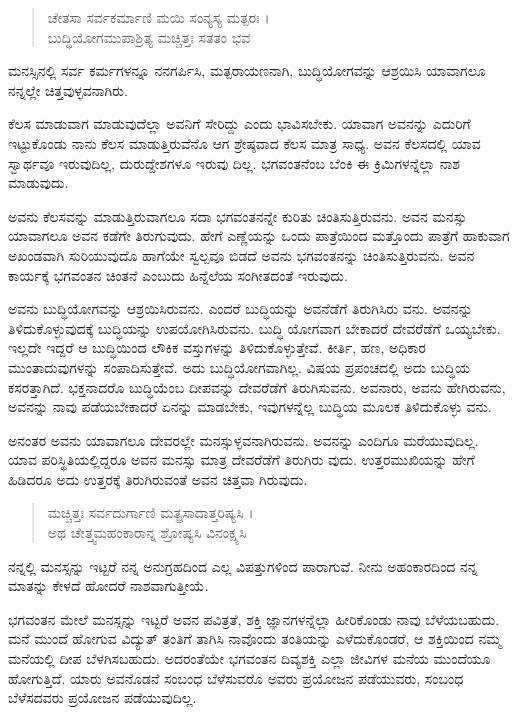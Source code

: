 \begin{verse}
ಚೇತಸಾ ಸರ್ವಕರ್ಮಾಣಿ ಮಯಿ ಸಂನ್ಯಸ್ಯ ಮತ್ಪರಃ ।\\ಬುದ್ಧಿಯೋಗಮುಪಾಶ್ರಿತ್ಯ ಮಚ್ಚಿತ್ತಃ ಸತತಂ ಭವ 
\end{verse}

{\small ಮನಸ್ಸಿನಲ್ಲಿ ಸರ್ವ ಕರ್ಮಗಳನ್ನೂ ನನಗರ್ಪಿಸಿ, ಮತ್ಪರಾಯಣನಾಗಿ, ಬುದ್ಧಿಯೋಗವನ್ನು ಆಶ್ರಯಿಸಿ ಯಾವಾಗಲೂ ನನ್ನಲ್ಲೇ ಚಿತ್ತವುಳ್ಳವನಾಗಿರು.}

ಕೆಲಸ ಮಾಡುವಾಗ ಮಾಡುವುದೆಲ್ಲಾ ಅವನಿಗೆ ಸೇರಿದ್ದು ಎಂದು ಭಾವಿಸಬೇಕು. ಯಾವಾಗ ಅವನನ್ನು ಎದುರಿಗೆ ಇಟ್ಟುಕೊಂಡು ನಾನು ಕೆಲಸ ಮಾಡುತ್ತಿರುವೆನೊ ಆಗ ಶ್ರೇಷ್ಠವಾದ ಕೆಲಸ ಮಾತ್ರ ಸಾಧ್ಯ. ಅವನ ಕೆಲಸದಲ್ಲಿ ಯಾವ ಸ್ವಾರ್ಥವೂ ಇರುವುದಿಲ್ಲ, ದುರುದ್ದೇಶಗಳೂ ಇರುವು ದಿಲ್ಲ. ಭಗವಂತನೆಂಬ ಬೆಂಕಿ ಈ ಕ್ರಿಮಿಗಳನ್ನೆಲ್ಲಾ ನಾಶ ಮಾಡುವುದು.

ಅವನು ಕೆಲಸವನ್ನು ಮಾಡುತ್ತಿರುವಾಗಲೂ ಸದಾ ಭಗವಂತನನ್ನೇ ಕುರಿತು ಚಿಂತಿಸುತ್ತಿರುವನು. ಅವನ ಮನಸ್ಸು ಯಾವಾಗಲೂ ಅವನ ಕಡೆಗೇ ತಿರುಗುವುದು. ಹೇಗೆ ಎಣ್ಣೆಯನ್ನು ಒಂದು ಪಾತ್ರೆಯಿಂದ ಮತ್ತೊಂದು ಪಾತ್ರೆಗೆ ಹಾಕುವಾಗ ಅಖಂಡವಾಗಿ ಸುರಿಯುವುದೊ ಹಾಗೆಯೇ ಸ್ವಲ್ಪವೂ ಬಿಡದೆ ಅವನು ಭಗವಂತನನ್ನು ಚಿಂತಿಸುತ್ತಿರುವನು. ಅವನ ಕಾರ್ಯಕ್ಕೆ ಭಗವಂತನ ಚಿಂತನೆ ಎಂಬುದು ಹಿನ್ನೆಲೆಯ ಸಂಗೀತದಂತೆ ಇರುವುದು.

ಅವನು ಬುದ್ಧಿಯೋಗವನ್ನು ಆಶ್ರಯಿಸಿರುವನು. ಎಂದರೆ ಬುದ್ಧಿಯನ್ನು ಅವನೆಡೆಗೆ ತಿರುಗಿಸಿರು ವನು. ಅವನನ್ನು ತಿಳಿದುಕೊಳ್ಳುವುದಕ್ಕೆ ಬುದ್ಧಿಯನ್ನು ಉಪಯೋಗಿಸಿರುವನು. ಬುದ್ಧಿ ಯೋಗವಾಗ ಬೇಕಾದರೆ ದೇವರೆಡೆಗೆ ಒಯ್ಯಬೇಕು. ಇಲ್ಲದೇ ಇದ್ದರೆ ಆ ಬುದ್ಧಿಯಿಂದ ಲೌಕಿಕ ವಸ್ತುಗಳನ್ನು ತಿಳಿದುಕೊಳ್ಳುತ್ತೇವೆ. ಕೀರ್ತಿ, ಹಣ, ಅಧಿಕಾರ ಮುಂತಾದುವುಗಳನ್ನು ಸಂಪಾದಿಸುತ್ತೇವೆ. ಅದು ಬುದ್ಧಿಯೋಗವಾಗಿಲ್ಲ. ವಿಷಯ ಪ್ರಪಂಚದಲ್ಲಿ ಅದು ಬುದ್ಧಿಯ ಕಸರತ್ತಾಗಿದೆ. ಭಕ್ತನಾದರೊ ಬುದ್ಧಿಯೆಂಬ ದೀಪವನ್ನು ದೇವರೆಡೆಗೆ ತಿರುಗಿಸುವನು. ಅವನಾರು, ಅವನು ಹೇಗಿರುವನು, ಅವನನ್ನು ನಾವು ಪಡೆಯಬೇಕಾದರೆ ಏನನ್ನು ಮಾಡಬೇಕು, ಇವುಗಳನ್ನೆಲ್ಲ ಬುದ್ಧಿಯ ಮೂಲಕ ತಿಳಿದುಕೊಳ್ಳು ವನು.

ಅನಂತರ ಅವನು ಯಾವಾಗಲೂ ದೇವರಲ್ಲೇ ಮನಸ್ಸುಳ್ಳವನಾಗಿರುವನು. ಅವನನ್ನು ಎಂದಿಗೂ ಮರೆಯುವುದಿಲ್ಲ. ಯಾವ ಪರಿಸ್ಥಿತಿಯಲ್ಲಿದ್ದರೂ ಅವನ ಮನಸ್ಸು ಮಾತ್ರ ದೇವರೆಡೆಗೆ ತಿರುಗಿರು ವುದು. ಉತ್ತರಮುಖಿಯನ್ನು ಹೇಗೆ ಹಿಡಿದರೂ ಅದು ಉತ್ತರಕ್ಕೆ ತಿರುಗಿರುವಂತೆ ಅವನ ಚಿತ್ತವಾ ಗಿರುವುದು.

\begin{verse}
ಮಚ್ಚಿತ್ತಃ ಸರ್ವದುರ್ಗಾಣಿ ಮತ್ಪ್ರಸಾದಾತ್ತರಿಷ್ಯಸಿ ।\\ಅಥ ಚೇತ್ತ್ವಮಹಂಕಾರಾನ್ನ ಶ್ರೋಷ್ಯಸಿ ವಿನಂಕ್ಷ್ಯಸಿ 
\end{verse}

{\small ನನ್ನಲ್ಲಿ ಮನಸ್ಸನ್ನು ಇಟ್ಟರೆ ನನ್ನ ಅನುಗ್ರಹದಿಂದ ಎಲ್ಲ ವಿಪತ್ತುಗಳಿಂದ ಪಾರಾಗುವೆ. ನೀನು ಅಹಂಕಾರದಿಂದ ನನ್ನ ಮಾತನ್ನು ಕೇಳದೆ ಹೋದರೆ ನಾಶವಾಗುತ್ತೀಯೆ.}

ಭಗವಂತನ ಮೇಲೆ ಮನಸ್ಸನ್ನು ಇಟ್ಟರೆ ಅವನ ಪವಿತ್ರತೆ, ಶಕ್ತಿ ಜ್ಞಾನಗಳನ್ನೆಲ್ಲಾ ಹೀರಿಕೊಂಡು ನಾವು ಬೆಳೆಯಬಹುದು. ಮನೆ ಮುಂದೆ ಹೋಗುವ ವಿದ್ಯುತ್ ತಂತಿಗೆ ತಾಗಿಸಿ ನಾವೊಂದು ತಂತಿಯನ್ನು ಎಳೆದುಕೊಂಡರೆ, ಆ ಶಕ್ತಿಯಿಂದ ನಮ್ಮ ಮನೆಯಲ್ಲಿ ದೀಪ ಬೆಳಗಿಸಬಹುದು. ಅದರಂತೆಯೇ ಭಗವಂತನ ದಿವ್ಯಶಕ್ತಿ ಎಲ್ಲಾ ಜೀವಿಗಳ ಮನೆಯ ಮುಂದೆಯೂ ಹೋಗುತ್ತಿದೆ. ಯಾರು ಅವನೊಡನೆ ಸಂಬಂಧ ಬೆಳೆಸುವರೊ ಅವರು ಪ್ರಯೋಜನ ಪಡೆಯುವರು, ಸಂಬಂಧ ಬೆಳೆಸದವರು ಪ್ರಯೋಜನ ಪಡೆಯುವುದಿಲ್ಲ.

